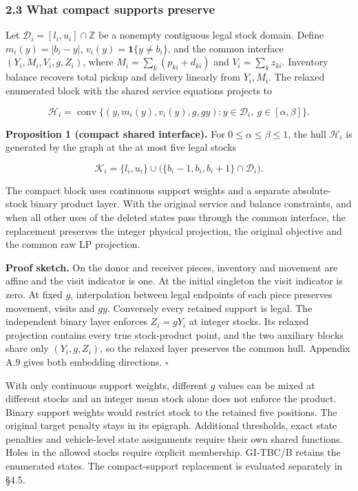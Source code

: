 \documentclass[
  american,
  11pt,
]{article}
\newcounter{none} %
\begin{document}
\subsubsection{2.3 What compact supports
preserve}\label{what-compact-supports-preserve}

Let \(\mathcal D_i=[l_i,u_i]\cap\mathbb Z\) be a nonempty contiguous
legal stock domain. Define \(m_i(y)=|b_i-y|\),
\(v_i(y)=\mathbf1\{y\ne b_i\}\), and the common interface
\((Y_i,M_i,V_i,g,Z_i)\), where \(M_i=\sum_k(p_{ki}+d_{ki})\) and
\(V_i=\sum_k z_{ki}\). Inventory balance recovers total pickup and
delivery linearly from \(Y_i,M_i\). The relaxed enumerated block with
the shared service equations projects to

\[
\mathcal H_i=\operatorname{conv}\{(y,m_i(y),v_i(y),g,gy):y\in\mathcal D_i,\ g\in[\alpha,\beta]\}.
\]


\textbf{Proposition 1 (compact shared interface).} For
\(0\le\alpha\le\beta\le 1\), the hull \(\mathcal H_i\) is generated by
the graph at the at most five legal stocks

\[
\mathcal K_i=\{l_i,u_i\}\cup\bigl(\{b_i-1,b_i,b_i+1\}\cap\mathcal D_i\bigr).
\]

The compact block uses continuous support weights and a separate
absolute-stock binary product layer. With the original service and
balance constraints, and when all other uses of the deleted states pass
through the common interface, the replacement preserves the integer
physical projection, the original objective and the common raw LP
projection.

\textbf{Proof sketch.} On the donor and receiver pieces, inventory and
movement are affine and the visit indicator is one. At the initial
singleton the visit indicator is zero. At fixed \(g\), interpolation
between legal endpoints of each piece preserves movement, visits and
\(gy\). Conversely every retained support is legal. The independent
binary layer enforces \(Z_i=gY_i\) at integer stocks. Its relaxed
projection contains every true stock-product point, and the two
auxiliary blocks share only \((Y_i,g,Z_i)\), so the relaxed layer
preserves the common hull. Appendix A.9 gives both embedding directions.
\(\square\)

With only continuous support weights, different \(g\) values can be
mixed at different stocks and an integer mean stock alone does not
enforce the product. Binary support weights would restrict stock to the
retained five positions. The original target penalty stays in its
epigraph. Additional thresholds, exact state penalties and vehicle-level
state assignments require their own shared functions. Holes in the
allowed stocks require explicit membership. GI-TBC/B retains the
enumerated states. The compact-support replacement is evaluated
separately in §4.5.
\end{document}
